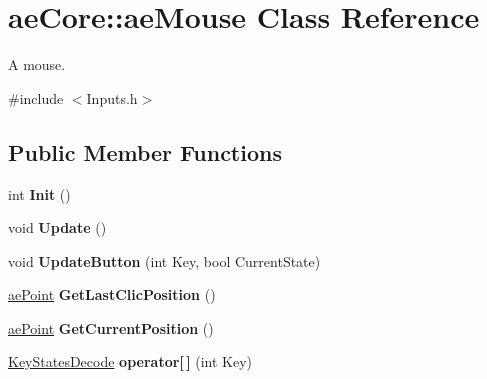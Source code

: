 \hypertarget{classae_core_1_1ae_mouse}{}\section{ae\+Core\+:\+:ae\+Mouse Class Reference}
\label{classae_core_1_1ae_mouse}


A mouse.  




{\ttfamily \#include $<$Inputs.\+h$>$}

\subsection*{Public Member Functions}
\begin{DoxyCompactItemize}
\item 
int {\bfseries Init} ()\hypertarget{classae_core_1_1ae_mouse_a40071a7a8a0b0a49ceeafd42af294e58}{}\label{classae_core_1_1ae_mouse_a40071a7a8a0b0a49ceeafd42af294e58}

\item 
void {\bfseries Update} ()\hypertarget{classae_core_1_1ae_mouse_a9b1f3bb34ea845ac1ca20f239f4427d2}{}\label{classae_core_1_1ae_mouse_a9b1f3bb34ea845ac1ca20f239f4427d2}

\item 
void {\bfseries Update\+Button} (int Key, bool Current\+State)\hypertarget{classae_core_1_1ae_mouse_a1aa4d911c094c948a355ee3ae3fe4244}{}\label{classae_core_1_1ae_mouse_a1aa4d911c094c948a355ee3ae3fe4244}

\item 
\hyperlink{structae_core_1_1ae_point}{ae\+Point} {\bfseries Get\+Last\+Clic\+Position} ()\hypertarget{classae_core_1_1ae_mouse_adbe7f48c29350c4dd254491fe01078cd}{}\label{classae_core_1_1ae_mouse_adbe7f48c29350c4dd254491fe01078cd}

\item 
\hyperlink{structae_core_1_1ae_point}{ae\+Point} {\bfseries Get\+Current\+Position} ()\hypertarget{classae_core_1_1ae_mouse_aaef133ff91c97b239a46102900b8cb94}{}\label{classae_core_1_1ae_mouse_aaef133ff91c97b239a46102900b8cb94}

\item 
\hyperlink{namespaceae_core_aa7afae6827a908a9adc5250cf17d52cb}{Key\+States\+Decode} {\bfseries operator\mbox{[}$\,$\mbox{]}} (int Key)\hypertarget{classae_core_1_1ae_mouse_a0bf4f8cf35a6ce4c22288b22c7ed4b19}{}\label{classae_core_1_1ae_mouse_a0bf4f8cf35a6ce4c22288b22c7ed4b19}

\end{DoxyCompactItemize}
